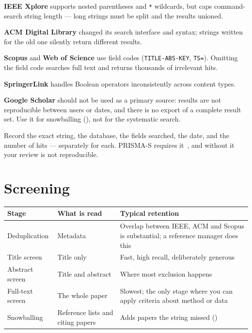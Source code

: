 \begin{pitfall}
\begin{tight}
  \item \textbf{IEEE Xplore} supports nested parentheses and \texttt{*}
    wildcards, but caps command-search string length --- long strings must be
    split and the results unioned.
  \item \textbf{ACM Digital Library} changed its search interface and syntax;
    strings written for the old one silently return different results.
  \item \textbf{Scopus} and \textbf{Web of Science} use field codes
    (\texttt{TITLE-ABS-KEY}, \texttt{TS=}). Omitting the field code searches
    full text and returns thousands of irrelevant hits.
  \item \textbf{SpringerLink} handles Boolean operators inconsistently across
    content types.
  \item \textbf{Google Scholar} should not be used as a primary source: results
    are not reproducible between users or dates, and there is no export of a
    complete result set. Use it for snowballing (), not for the
    systematic search.
\end{tight}
\medskip
Record the exact string, the database, the fields searched, the date, and the
number of hits --- separately for each. PRISMA-S requires
it~\cite{rethlefsen2021prisma}, and without it your review is not reproducible.
\end{pitfall}

\section{Screening}

\begin{center}
\small
\begin{tabular}{@{}L{2.6cm}L{4.6cm}L{7.0cm}@{}}
\toprule
\textbf{Stage} & \textbf{What is read} & \textbf{Typical retention} \\
\midrule
Deduplication & Metadata & Overlap between IEEE, ACM and Scopus is
                           substantial; a reference manager does this \\
Title screen  & Title only & Fast, high recall, deliberately generous \\
Abstract screen & Title and abstract & Where most exclusion happens \\
Full-text screen & The whole paper & Slowest; the only stage where you can
                                     apply criteria about method or data \\
Snowballing   & Reference lists and citing papers & Adds papers the string
                                                    missed () \\
\bottomrule
\end{tabular}
\end{center}

